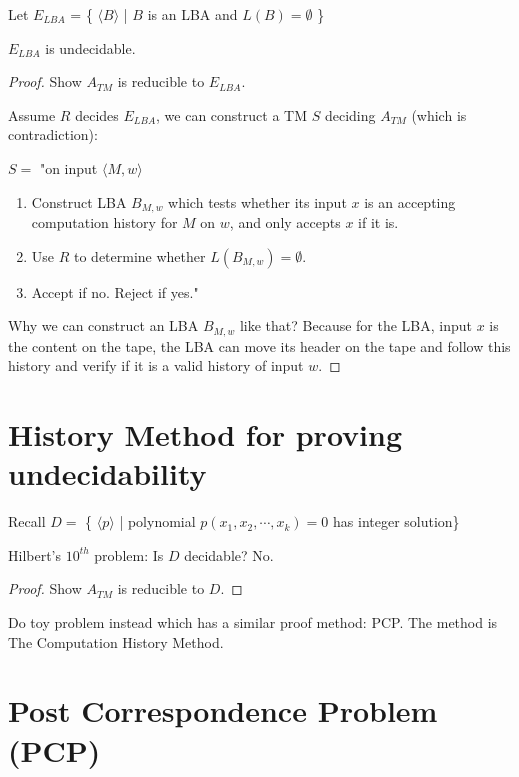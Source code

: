 \begin{theorem}
    Let \(E_{LBA}\) = \{ \(\langle B \rangle\) | \(B\) is an LBA and \(L(B) = \emptyset\)  \} 

    \(E_{LBA}\) is undecidable. 
\end{theorem}
\begin{proof}
    Show \(A_{TM}\) is reducible to \(E_{LBA}\).  

    Assume \(R\) decides \(E_{LBA}\), we can construct a TM \(S\) deciding \(A_{TM}\) (which is contradiction): 

    \(S = \) "on input \(\langle M, w \rangle\)
    \begin{enumerate}
        \item Construct LBA \(B_{M, w}\) which tests whether its input \(x\) is an accepting computation history for \(M\) on \(w\), and only accepts \(x\) if it is.
        \item Use \(R\) to determine whether \(L(B_{M, w}) = \emptyset\).       
        \item Accept if no. Reject if yes."
    \end{enumerate}    

    Why we can construct an LBA \(B_{M, w}\) like that? Because for the LBA, input \(x\) is the content on the tape, the LBA can move its header on the tape and follow this history and verify if it is a valid history of input \(w\).  
\end{proof}


\section{History Method for proving undecidability}

\begin{example}
    Recall  \(D = \) \{ \(\langle p \rangle\) | polynomial \(p(x_1, x_2, \cdots, x_k) = 0\) has integer solution\}
\end{example}
\begin{theorem}
    Hilbert's \(10^{th}\) problem: Is \(D\) decidable? No.  
\end{theorem}
\begin{proof}
    Show \(A_{TM}\) is reducible to \(D\).   
\end{proof}

Do toy problem instead which has a similar proof method: PCP. The method is The Computation History Method.

\section{Post Correspondence Problem (PCP)}

